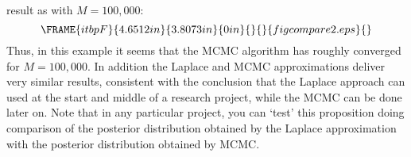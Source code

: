 \documentclass[12pt,thmsa]{article}
\begin{document}
\begin{enumerate}
result as with $M=100,000:$%
\begin{equation*}
\end{equation*}%
\begin{equation*}
\end{equation*}%
\begin{equation*}
\FRAME{itbpF}{4.6512in}{3.8073in}{0in}{}{}{figcompare2.eps}{\special%
{language "Scientific Word";type "GRAPHIC";maintain-aspect-ratio
TRUE;display "USEDEF";valid_file "F";width 4.6512in;height 3.8073in;depth
0in;original-width 6.0848in;original-height 4.9741in;cropleft "0";croptop
"1";cropright "1";cropbottom "0";filename 'figcompare2.eps';file-properties
"XNPEU";}}
\end{equation*}%
\begin{equation*}
\end{equation*}%
Thus, in this example it seems that the MCMC algorithm has roughly converged
for $M=100,000.$ In addition the Laplace and MCMC approximations deliver
very similar results, consistent with the conclusion that the Laplace
approach can used at the start and middle of a research project, while the
MCMC can be done later on. Note that in any particular project, you can
`test' this proposition doing comparison of the posterior distribution
obtained by the Laplace approximation with the posterior distribution
obtained by MCMC.


\end{enumerate}
\end{document}
